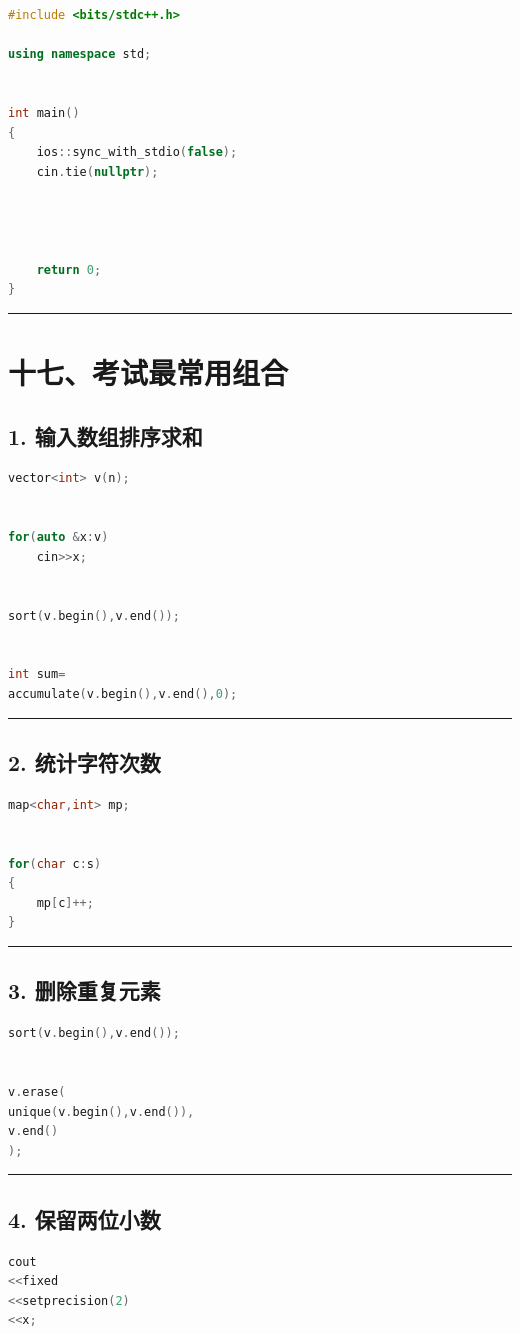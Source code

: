 \documentclass[10pt,twocolumn]{extarticle}
\begin{document}
\begin{lstlisting}[language=C++]
#include <bits/stdc++.h>

using namespace std;


int main()
{
    ios::sync_with_stdio(false);
    cin.tie(nullptr);


    

    return 0;
}
\end{lstlisting}

\noindent\rule{\linewidth}{0.4pt}

\section{十七、考试最常用组合}

\subsection{1. 输入数组排序求和}
\begin{lstlisting}[language=C++]
vector<int> v(n);


for(auto &x:v)
    cin>>x;


sort(v.begin(),v.end());


int sum=
accumulate(v.begin(),v.end(),0);
\end{lstlisting}

\noindent\rule{\linewidth}{0.4pt}

\subsection{2. 统计字符次数}
\begin{lstlisting}[language=C++]
map<char,int> mp;


for(char c:s)
{
    mp[c]++;
}
\end{lstlisting}

\noindent\rule{\linewidth}{0.4pt}

\subsection{3. 删除重复元素}
\begin{lstlisting}[language=C++]
sort(v.begin(),v.end());


v.erase(
unique(v.begin(),v.end()),
v.end()
);
\end{lstlisting}

\noindent\rule{\linewidth}{0.4pt}

\subsection{4. 保留两位小数}
\begin{lstlisting}[language=C++]
cout
<<fixed
<<setprecision(2)
<<x;
\end{lstlisting}
\end{document}
